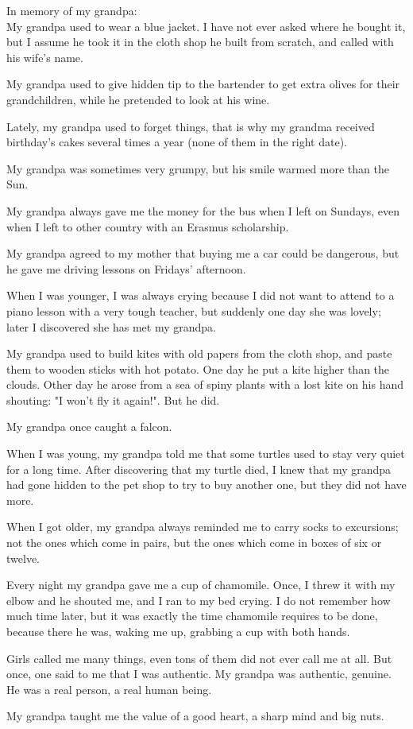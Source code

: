 \begin{itshape}

In memory of my grandpa:\\

My grandpa used to wear a blue jacket. I have not ever asked where he bought it, but I assume he took it in the  cloth shop he built from scratch, and called with his wife's name.

My grandpa used to give hidden tip to the bartender to get extra olives for their grandchildren, while he pretended to look at his wine.

Lately, my grandpa used to forget things, that is why my grandma received birthday's cakes several times a year (none of them in the right date).

My grandpa was sometimes very grumpy, but his smile warmed more than the Sun.

My grandpa always gave me the money for the bus when I left on Sundays, even when I left to other country with an Erasmus scholarship.

My grandpa agreed to my mother that buying me a car could be dangerous, but he gave me driving lessons on Fridays' afternoon.

When I was younger, I was always crying because I did not want to attend to a piano lesson with a very tough teacher, but suddenly one day she was lovely; later I discovered she has met my grandpa.

My grandpa used to build kites with old papers from the cloth shop, and paste them to wooden sticks with hot potato. One day he put a kite higher than the clouds. Other day he arose from a sea of spiny plants with a lost kite on his hand shouting: "I won't fly it again!". But he did.

My grandpa once caught a falcon.

When I was young, my grandpa told me that some turtles used to stay very quiet for a long time. After discovering that my turtle died, I knew that my grandpa had gone hidden to the pet shop to try to buy another one, but they did not have more.

When I got older, my grandpa always reminded me to carry socks to excursions; not the ones which come in pairs, but the ones which come in boxes of six or twelve.

Every night my grandpa gave me a cup of chamomile. Once, I threw it with my elbow and he shouted me, and I ran to my bed crying. I do not remember how much time later, but it was exactly the time chamomile requires to be done, because there he was, waking me up, grabbing a cup with both hands.

Girls called me many things, even tons of them did not ever call me at all. But once, one said to me that I was authentic. My grandpa was authentic, genuine. He was a real person, a real human being.

My grandpa taught me the value of a good heart, a sharp mind and big nuts.

\end{itshape}
